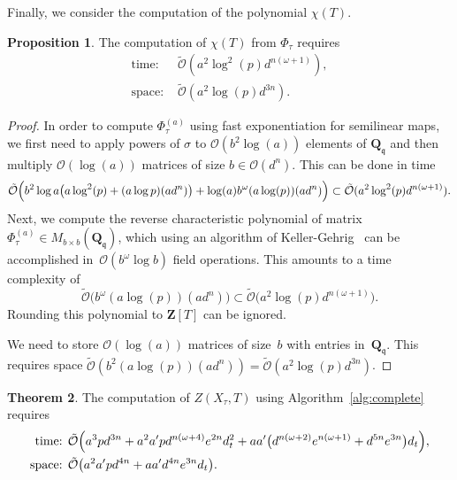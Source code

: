 \documentclass[a4paper,11pt]{article}
\numberwithin{equation}{section}
\newcommand{\ZZ}{\mathbf{Z}} %
\newcommand{\QQ}{\mathbf{Q}} %
\providecommand{\BigOh}{\mathcal{O}}          %
\providecommand{\SoftOh}{\tilde{\mathcal{O}}} %
\theoremstyle{definition}
\newtheorem{thm}{Theorem}[section]
\newtheorem{prop}[thm]{Proposition}
\begin{document}
Finally, we consider the computation of the polynomial $\chi(T)$.

\begin{prop}
The computation of $\chi(T)$ from $\Phi_{\tau}$ requires
\begin{align*}
\mbox{time: }  & \SoftOh(a^2  \log^2(p) d^{n(\omega+1)}), \\
\mbox{space: } & \SoftOh(a^2 \log(p) d^{3n}).
\end{align*}
\end{prop}

\begin{proof}
In order to compute $\Phi_{\tau}^{(a)}$ using fast exponentiation for 
semilinear maps, we first need to apply powers of $\sigma$ to $\BigOh(b^2 \log(a))$ 
elements of $\QQ_{\mathfrak{q}}$ and then multiply $\BigOh(\log(a))$ matrices 
of size $b \in \BigOh(d^n)$. This can be done in time 
\begin{gather*}
\SoftOh\Bigl( b^2 \log a \bigl( a \log^2(p) + (a \log p)(a d^n)  \bigr) 
    + \log(a) b^{\omega} (a \log(p))(a d^n)  \Bigr) 
\subset \SoftOh(a^2  \log^2(p) d^{n(\omega+1)}).
\end{gather*}
Next, we compute the reverse characteristic polynomial of matrix 
$\Phi_{\tau}^{(a)} \in M_{b \times b}(\QQ_{\mathfrak{q}})$, which 
using an algorithm of Keller-Gehrig~\citep{KellerGehrig1985} can 
be accomplished in~$\BigOh(b^{\omega} \log b)$ field operations. 
This amounts to a time complexity of 
\begin{equation*}
\SoftOh\bigl(b^{\omega} (a \log(p))(a d^n) \bigr)
    \subset \SoftOh\bigl( a^2 \log(p) d^{n(\omega+1)} \bigr).
\end{equation*}
Rounding this polynomial to $\ZZ[T]$ can be ignored.

We need to store $\BigOh(\log(a))$ matrices of size~$b$ with entries 
in~$\QQ_{\mathfrak{q}}$.  This requires space 
$\SoftOh(b^2 (a \log(p)) (a d^n)) = \SoftOh(a^2 \log(p) d^{3n})$.
\end{proof}

\begin{thm}
The computation of $Z(X_{\tau},T)$ using Algorithm~\ref{alg:complete} requires
\begin{align*}
\mbox{time: }  &\SoftOh\Bigl( 
                a^3 p d^{3n} + 
                a^2 a' p d^{n(\omega+4)} e^{2n} d_t^2+
                aa' \bigl(d^{n(\omega+2)} e^{n(\omega+1)}+ d^{5n} e^{3n}\bigr) d_t 
                \Bigr), \\
\mbox{space: } &\SoftOh\bigl( a^2 a' p d^{4n} + a a' d^{4n} e^{3n} d_t \bigr).
\end{align*}
\end{thm}
\end{document}
